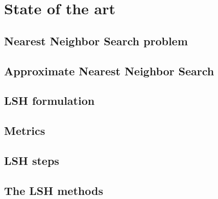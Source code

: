 \chapter{State of the art}

\section{Nearest Neighbor Search problem}


\section{Approximate Nearest Neighbor Search}





\section{LSH formulation}

\clearpage


\section{Metrics}

\clearpage

\section{LSH steps}

\clearpage

\section{The LSH methods}

